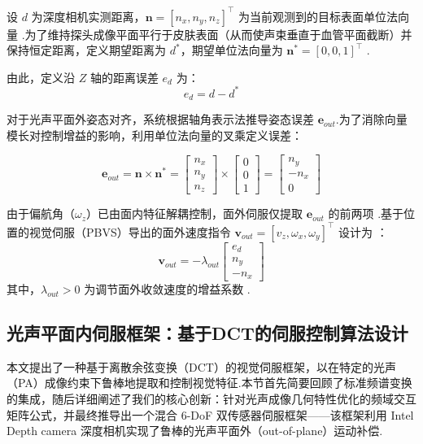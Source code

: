 \documentclass{article}
\begin{document}
设 $d$ 为深度相机实测距离，$\mathbf{n} = [n_x, n_y, n_z]^\top$ 为当前观测到的目标表面单位法向量 .为了维持探头成像平面平行于皮肤表面（从而使声束垂直于血管平面截断）并保持恒定距离，定义期望距离为 $d^*$，期望单位法向量为 $\mathbf{n}^* = [0, 0, 1]^\top$ .

由此，定义沿 $Z$ 轴的距离误差 $e_d$ 为：
\begin{equation}
e_d = d - d^*
\end{equation}

对于光声平面外姿态对齐，系统根据轴角表示法推导姿态误差 $\mathbf{e}_{out}$.为了消除向量模长对控制增益的影响，利用单位法向量的叉乘定义误差：

\begin{equation}
\mathbf{e}_{out} = \mathbf{n} \times \mathbf{n}^* = \begin{bmatrix} n_x \\ n_y \\ n_z \end{bmatrix} \times \begin{bmatrix} 0 \\ 0 \\ 1 \end{bmatrix} = \begin{bmatrix} n_y \\ -n_x \\ 0 \end{bmatrix}
\end{equation}

由于偏航角（$\omega_z$）已由面内特征解耦控制，面外伺服仅提取 $\mathbf{e}_{out}$ 的前两项 .基于位置的视觉伺服（PBVS）导出的面外速度指令 $\mathbf{v}_{out} = [v_z, \omega_x, \omega_y]^\top$ 设计为 ：
\begin{equation}
\mathbf{v}_{out} = -\lambda_{out} \begin{bmatrix} e_d \\ n_y \\ -n_x \end{bmatrix}
\end{equation}
其中，$\lambda_{out} > 0$ 为调节面外收敛速度的增益系数 .


\subsection{光声平面内伺服框架：基于DCT的伺服控制算法设计}
\label{sec:algorithm}

本文提出了一种基于离散余弦变换（DCT）的视觉伺服框架，以在特定的光声（PA）成像约束下鲁棒地提取和控制视觉特征.本节首先简要回顾了标准频谱变换的集成，随后详细阐述了我们的核心创新：针对光声成像几何特性优化的频域交互矩阵公式，并最终推导出一个混合 6-DoF 双传感器伺服框架——该框架利用 Intel Depth camera 深度相机实现了鲁棒的光声平面外（out-of-plane）运动补偿.
\end{document}
